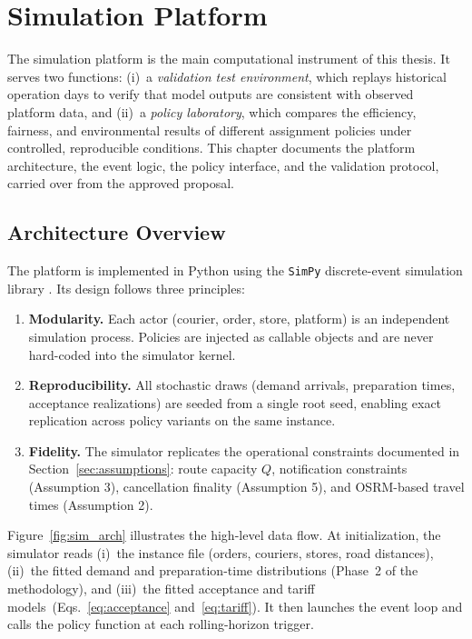 \documentclass[12pt,a4paper]{report}
\begin{document}
\chapter{Simulation Platform}
\label{ch:simulation}
\label{sec:simulation}

The simulation platform is the main computational instrument of this thesis. It serves two functions: (i)~a \emph{validation test environment}, which replays historical operation days to verify that model outputs are consistent with observed platform data, and (ii)~a \emph{policy laboratory}, which compares the efficiency, fairness, and environmental results of different assignment policies under controlled, reproducible conditions. This chapter documents the platform architecture, the
event logic, the policy interface, and the validation protocol, carried over from the approved proposal.

\section{Architecture Overview}

The platform is implemented in Python using the \texttt{SimPy} discrete-event simulation library \citep{simpy2023}. Its design follows three principles:

\begin{enumerate}
    \item \textbf{Modularity.} Each actor (courier, order, store, platform) is an independent simulation process. Policies are injected as callable objects and are never hard-coded into the simulator kernel.
    \item \textbf{Reproducibility.} All stochastic draws (demand arrivals, preparation times, acceptance realizations) are seeded from a single root seed, enabling exact replication across policy variants on the same instance.
    \item \textbf{Fidelity.} The simulator replicates the operational constraints documented in Section~\ref{sec:assumptions}: route capacity $Q$, notification constraints (Assumption 3), cancellation finality (Assumption 5), and OSRM-based travel times (Assumption 2).
\end{enumerate}

Figure~\ref{fig:sim_arch} illustrates the high-level data flow. At initialization, the simulator reads (i)~the instance file (orders, couriers, stores, road distances), (ii)~the fitted demand and preparation-time distributions (Phase~2 of the methodology), and (iii)~the fitted acceptance and tariff models~(Eqs.~\ref{eq:acceptance} and~\ref{eq:tariff}). It then launches the event loop and calls the policy function at each rolling-horizon trigger.
\end{document}

